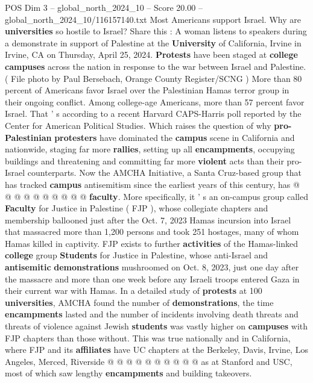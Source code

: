 \begin{textsample}{POS Dim 3 – global\_north\_2024\_10 – Score 20.00 – global\_north\_2024\_10/116157140.txt}  \label{ex:f3_pos_124}
Most Americans support Israel.
Why are \textbf{universities} so hostile to Israel?
Share this : A woman listens to speakers during a demonstrate in support of Palestine at the \textbf{University} of California, Irvine in Irvine, CA on Thursday, April 25, 2024. \textbf{Protests} have been staged at \textbf{college} \textbf{campuses} across the nation in response to the war between Israel and Palestine. ( File photo by Paul Bersebach, Orange County Register/SCNG ) More than 80 percent of Americans favor Israel over the Palestinian Hamas terror group in their ongoing conflict.
Among college-age Americans, more than 57 percent favor Israel.
That ' s according to a recent Harvard CAPS-Harris poll reported by the Center for American Political Studies.
Which raises the question of why \textbf{pro-Palestinian} \textbf{protesters} have dominated the \textbf{campus} scene in California and nationwide, staging far more \textbf{rallies}, setting up all \textbf{encampments}, occupying buildings and threatening and committing far more \textbf{violent} acts than their pro-Israel counterparts.
Now the AMCHA Initiative, a Santa Cruz-based group that has tracked \textbf{campus} antisemitism since the earliest years of this century, has @ @ @ @ @ @ @ @ @ @ \textbf{faculty}.
More specifically, it ' s an on-campus group called \textbf{Faculty} for Justice in Palestine ( FJP ), whose collegiate chapters and membership ballooned just after the Oct. 7, 2023 Hamas incursion into Israel that massacred more than 1,200 persons and took 251 hostages, many of whom Hamas killed in captivity.
FJP exists to further \textbf{activities} of the Hamas-linked \textbf{college} group \textbf{Students} for Justice in Palestine, whose anti-Israel and \textbf{antisemitic} \textbf{demonstrations} mushroomed on Oct. 8, 2023, just one day after the massacre and more than one week before any Israeli troops entered Gaza in their current war with Hamas.
In a detailed study of \textbf{protests} at 100 \textbf{universities}, AMCHA found the number of \textbf{demonstrations}, the time \textbf{encampments} lasted and the number of incidents involving death threats and threats of violence against Jewish \textbf{students} was vastly higher on \textbf{campuses} with FJP chapters than those without.
This was true nationally and in California, where FJP and its \textbf{affiliates} have UC chapters at the Berkeley, Davis, Irvine, Los Angeles, Merced, Riverside @ @ @ @ @ @ @ @ @ @ as at Stanford and USC, most of which saw lengthy \textbf{encampments} and building takeovers.

\end{textsample}
